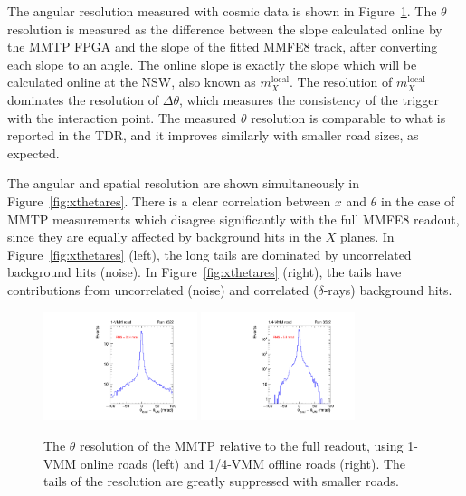 The angular resolution measured with cosmic data is shown in Figure~\ref{fig:thetares}. The $\theta$ resolution is measured as the difference between the slope calculated online by the MMTP FPGA and the slope of the fitted MMFE8 track, after converting each slope to an angle. The online slope is exactly the slope which will be calculated online at the NSW, also known as $m_X^\text{local}$. The resolution of $m_X^\text{local}$ dominates the resolution of $\Delta\theta$, which measures the consistency of the trigger with the interaction point. The measured $\theta$ resolution is comparable to what is reported in the TDR, and it improves similarly with smaller road sizes, as expected.

The angular and spatial resolution are shown simultaneously in Figure~\ref{fig:xthetares}. There is a clear correlation between $x$ and $\theta$ in the case of MMTP measurements which disagree significantly with the full MMFE8 readout, since they are equally affected by background hits in the $X$ planes. In Figure~\ref{fig:xthetares} (left), the long tails are dominated by uncorrelated background hits (noise). In Figure~\ref{fig:xthetares} (right), the tails have contributions from uncorrelated (noise) and correlated ($\delta$-rays) background hits.

\begin{figure}[!htpb]
  \begin{center}
    \includegraphics[width=0.4\textwidth]{figures/gbtanalysis3522/TP_angres_full.pdf}
    \includegraphics[width=0.4\textwidth]{figures/gbtanalysis3522/TP_angres.pdf}
  \end{center}
  \vspace{-10pt}
  \caption{The $\theta$ resolution of the MMTP relative to the full readout, using 1-VMM online roads (left) and 1/4-VMM offline roads (right). The tails of the resolution are greatly suppressed with smaller roads.}
  \label{fig:thetares}
\end{figure}

